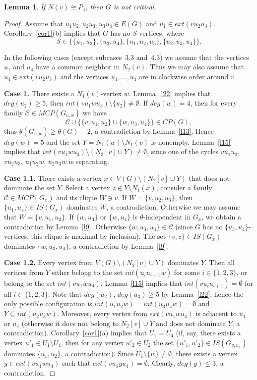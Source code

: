 \documentclass[12pt]{article}
\newtheorem{lemma}{Lemma}
\begin{document}
\begin{lemma}\label{l27}
If $N(v) \cong P_4$, then $G$ is not critical.
\end{lemma}

\begin{proof}

Assume that $u_1u_2,u_2u_3,u_3u_4 \in E(G)$ and $u_1 \in ext(vu_2u_3)$. Corollary~\ref{cor1}(b) implies that $G$ has no $S$-vertices, where $$S \in \{ \{u_1,u_2\}, \{u_3,u_4\}, \{u_1,u_2,u_3\}, \{u_2,u_3,u_4\}\}.$$ 

In the following cases (except subcases~3.3 and~4.3) we assume that the vertices $u_1$ and $u_4$ have a common neighbor in $N_2(v)$. Thus we may also assume that $u_4 \in ext(vu_2u_3)$ and the vertices $u_1,\ldots,u_4$ are in clockwise order around $v$.

\textbf{Case 1.} There exists a $N_1(v)$-vertex $w$. Lemma~\ref{l22} implies that $deg(u_2) \geq 5$, then $int(vu_1wu_3) \setminus \{u_2\} \neq \emptyset$. If $deg(w) = 4$, then for every family $\mathcal{C} \in MCP(G_{v,w})$ we have $$\mathcal{C} \cup \{\{v,u_1,u_2\} \cup \{w,u_3,u_4\}\} \in CP(G),$$ thus  $\theta(G_{v,w}) \geq \theta(G) - 2$, a contradiction by Lemma~\ref{l13}. Hence $deg(w) = 5$ and the set $Y = N_1(w) \setminus N_1(v)$ is nonempty. Lemma~\ref{l15} implies that $int(vu_1wu_3) \setminus (N_2[v] \cup Y) \neq \emptyset$, since one of the cycles $vu_1u_2$, $vu_2u_3$, $u_1u_2w$, $u_2u_3w$ is separating.

\textbf{Case 1.1.} There exists a vertex $x \in V(G) \setminus (N_2[v] \cup Y)$ that does not dominate the set $Y$. Select a vertex $z \in Y \setminus N_1(x)$, consider a family $\mathcal{C} \in MCP(G_x)$ and its clique $W \ni v$. If $W = \{v,u_2,u_3\}$, then $\{u_1,u_4\} \in IS(G_x)$ dominates $W$, a contradiction. Otherwise we may assume that $W = \{v,u_1,u_2\}$. If $\{w,u_3\}$ or $\{w,u_4\}$ is $\theta$-independent in $G_x$, we obtain a contradiction by Lemma~\ref{l9}. Otherwise $\{w,u_3,u_4\} \in \mathcal{C}$ (since $G$ has no $\{u_3,u_4\}$-vertices, this clique is maximal by inclusion). The set $\{v,z\} \in IS(G_x)$ dominates $\{w,u_3,u_4\}$, a contradiction by Lemma~\ref{l9}.

\textbf{Case 1.2.} Every vertex from $V(G) \setminus (N_2[v] \cup Y)$ dominates $Y$. Then  all vertices from $Y$ either belong to the set $int(u_iu_{i+1}w)$ for some $i \in \{1,2,3\}$, or belong to the set $int(vu_1wu_4)$. Lemma~\ref{l15} implies that $int(vu_iu_{i+1}) = \emptyset$ for all $i \in \{1,2,3\}$. Note that $deg(u_2)$, $deg(u_3) \geq 5$ by Lemma~\ref{l22}, hence the only possible configuration is $int(u_1u_2w) = int(u_3u_4w) = \emptyset$ and $Y \subseteq int(u_2u_3w)$. Moreover, every vertex from $ext(vu_1wu_4)$ is adjacent to $u_1$ or $u_4$ (otherwise it does not belong to $N_2[v] \cup Y$ and does not dominate $Y$, a contradiction). Corollary~\ref{cor1}(a) implies that $U_1 = U_4$ (if, say, there exists a vertex $u'_1 \in U_1 \setminus U_4$, then for any vertex $u'_2 \in U_2$ the set $\{u'_1,u'_2\} \in IS(G_{v,u_4})$ dominates $\{u_1,u_2\}$, a contradiction). Since $U_1 \setminus \{w\} \neq \emptyset$, there exists a vertex $y \in ext(vu_1wu_4)$ such that $ext(vu_1yu_4) = \emptyset$. Clearly, $deg(y) \leq 3$, a contradiction.


\end{proof}
\end{document}
